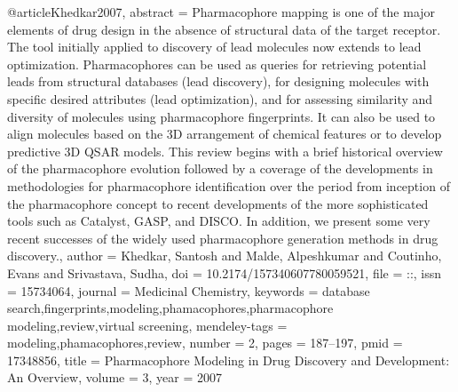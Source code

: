 @article{Khedkar2007,
abstract = {Pharmacophore mapping is one of the major elements of drug design in the absence of structural data of the target receptor. The tool initially applied to discovery of lead molecules now extends to lead optimization. Pharmacophores can be used as queries for retrieving potential leads from structural databases (lead discovery), for designing molecules with specific desired attributes (lead optimization), and for assessing similarity and diversity of molecules using pharmacophore fingerprints. It can also be used to align molecules based on the 3D arrangement of chemical features or to develop predictive 3D QSAR models. This review begins with a brief historical overview of the pharmacophore evolution followed by a coverage of the developments in methodologies for pharmacophore identification over the period from inception of the pharmacophore concept to recent developments of the more sophisticated tools such as Catalyst, GASP, and DISCO. In addition, we present some very recent successes of the widely used pharmacophore generation methods in drug discovery.},
author = {Khedkar, Santosh and Malde, Alpeshkumar and Coutinho, Evans and Srivastava, Sudha},
doi = {10.2174/157340607780059521},
file = {::},
issn = {15734064},
journal = {Medicinal Chemistry},
keywords = {database search,fingerprints,modeling,phamacophores,pharmacophore modeling,review,virtual screening},
mendeley-tags = {modeling,phamacophores,review},
number = {2},
pages = {187--197},
pmid = {17348856},
title = {{Pharmacophore Modeling in Drug Discovery and Development: An Overview}},
volume = {3},
year = {2007}
}
